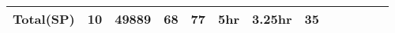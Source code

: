 \begin{table*}
\begin{CodeOut}
\begin{center}
\begin {tabular} {|l|c|c|c|c|c|c|c|c|c|c|c|c|}
Total(SP)&    10      &49889		&68		&77			&5hr			&3.25hr	&35\\
\hline

\end{tabular}
\end{center}
\end{CodeOut}
\vspace{- 0.35 in}
\end{table*}


